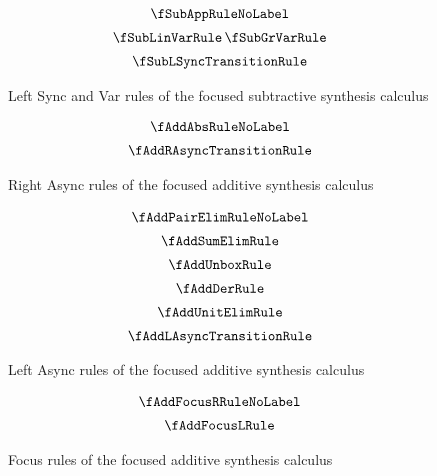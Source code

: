 \begin{figure}[H]
  \begin{align*}
\begin{array}{c}
  \fSubAppRuleNoLabel
  \\[0.5em]
  \fSubLinVarRule
  \,
  \fSubGrVarRule
  \\[0.5em]
  \fSubLSyncTransitionRule
  \end{array}
  \end{align*}
  \caption{Left Sync and Var rules of the focused subtractive synthesis calculus}
  \label{fig:focus-sub-left-sync}
\end{figure}

\begin{figure}[H]
  \begin{align*}
\begin{array}{c}
  \fAddAbsRuleNoLabel
  \\[0.5em]
  \fAddRAsyncTransitionRule
  \end{array}
  \end{align*}
  \caption{Right Async rules of the focused additive synthesis calculus}
  \label{fig:focus-add-right-async}
\end{figure}

\begin{figure}[H]
  \begin{align*}
\begin{array}{c}
  \fAddPairElimRuleNoLabel
  \\[0.5em]
  \fAddSumElimRule
  \\[0.5em]
  \fAddUnboxRule
  \\[0.5em]
  \fAddDerRule
  \\[0.5em]
  \fAddUnitElimRule
  \\[0.5em]
  \fAddLAsyncTransitionRule
  \end{array}
  \end{align*}
  \caption{Left Async rules of the focused additive synthesis calculus}
  \label{fig:focus-add-left-async}
\end{figure}

\begin{figure}[H]
  \begin{align*}
\begin{array}{c}
  \fAddFocusRRuleNoLabel
  \\[0.5em]
  \fAddFocusLRule
  \end{array}
  \end{align*}
  \caption{Focus rules of the focused additive synthesis calculus}
  \label{fig:focus-add-focus}
\end{figure}

